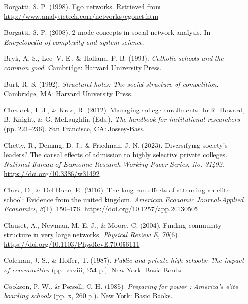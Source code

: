 \documentclass[
  12pt,
]{article}
\newlength{\cslhangindent}
\newlength{\cslentryspacingunit} %
\newenvironment{CSLReferences}[2] %
 {%
  \setlength{\parindent}{0pt}
  \ifodd #1
  \let\oldpar\par
  \def\par{\hangindent=\cslhangindent\oldpar}
  \fi
  \setlength{\parskip}{#2\cslentryspacingunit}
 }%
 {}
\begin{document}
\hypertarget{refs}{}
\begin{CSLReferences}{1}{0}
\leavevmode{}%
Borgatti, S. P. (1998). Ego networks. Retrieved from \url{http://www.analytictech.com/networks/egonet.htm}

\leavevmode{}%
Borgatti, S. P. (2008). 2-mode concepts in social network analysis. In \emph{Encyclopedia of complexity and system science}.

\leavevmode{}%
Bryk, A. S., Lee, V. E., \& Holland, P. B. (1993). \emph{Catholic schools and the common good}. Cambridge: Harvard University Press.

\leavevmode{}%
Burt, R. S. (1992). \emph{Structural holes: The social structure of competition}. Cambridge, MA: Harvard University Press.

\leavevmode{}%
Cheslock, J. J., \& Kroc, R. (2012). Managing college enrollments. In R. Howard, B. Knight, \& G. McLaughlin (Eds.), \emph{The handbook for institutional researchers} (pp. 221--236). San Francisco, CA: Jossey-Bass.

\leavevmode{}%
Chetty, R., Deming, D. J., \& Friedman, J. N. (2023). Diversifying society's leaders? The causal effects of admission to highly selective private colleges. \emph{National Bureau of Economic Research Working Paper Series}, \emph{No. 31492}. \url{https://doi.org/10.3386/w31492}

\leavevmode{}%
Clark, D., \& Del Bono, E. (2016). The long-run effects of attending an elite school: Evidence from the united kingdom. \emph{American Economic Journal-Applied Economics}, \emph{8}(1), 150--176. \url{https://doi.org/10.1257/app.20130505}

\leavevmode{}%
Clauset, A., Newman, M. E. J., \& Moore, C. (2004). Finding community structure in very large networks. \emph{Physical Review E}, \emph{70}(6). \url{https://doi.org/10.1103/PhysRevE.70.066111}

\leavevmode{}%
Coleman, J. S., \& Hoffer, T. (1987). \emph{Public and private high schools: The impact of communities} (pp. xxviii, 254 p.). New York: Basic Books.

\leavevmode{}%
Cookson, P. W., \& Persell, C. H. (1985). \emph{Preparing for power : America's elite boarding schools} (pp. x, 260 p.). New York: Basic Books.


\end{CSLReferences}
\end{document}
